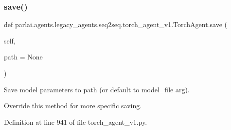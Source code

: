 \subsubsection{\texorpdfstring{save()}{save()}}
{\footnotesize\ttfamily def parlai.\+agents.\+legacy\+\_\+agents.\+seq2seq.\+torch\+\_\+agent\+\_\+v1.\+Torch\+Agent.\+save (\begin{DoxyParamCaption}\item[{}]{self,  }\item[{}]{path = {\ttfamily None} }\end{DoxyParamCaption})}

\begin{DoxyVerb}Save model parameters to path (or default to model_file arg).

Override this method for more specific saving.
\end{DoxyVerb}
 

Definition at line 941 of file torch\+\_\+agent\+\_\+v1.\+py.



